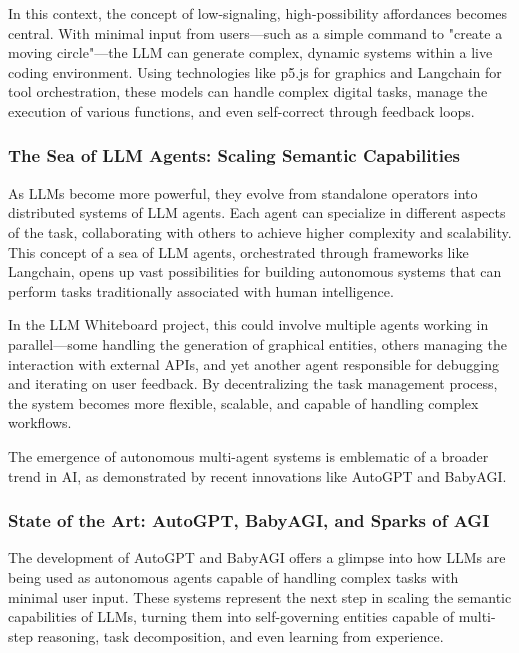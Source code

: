In this context, the concept of low-signaling, high-possibility affordances becomes central.
With minimal input from users—such as a simple command to "create a moving circle"—the LLM can generate complex, dynamic systems within a live coding environment.
Using technologies like p5.js for graphics and Langchain for tool orchestration, these models can handle complex digital tasks, manage the execution of various functions, and even self-correct through feedback loops.




\subsubsection{The Sea of LLM Agents: Scaling Semantic Capabilities}

As LLMs become more powerful, they evolve from standalone operators into distributed systems of LLM agents.
Each agent can specialize in different aspects of the task, collaborating with others to achieve higher complexity and scalability.
This concept of a sea of LLM agents, orchestrated through frameworks like Langchain, opens up vast possibilities for building autonomous systems that can perform tasks traditionally associated with human intelligence.

In the LLM Whiteboard project, this could involve multiple agents working in parallel—some handling the generation of graphical entities, others managing the interaction with external APIs, and yet another agent responsible for debugging and iterating on user feedback.
By decentralizing the task management process, the system becomes more flexible, scalable, and capable of handling complex workflows.

The emergence of autonomous multi-agent systems is emblematic of a broader trend in AI, as demonstrated by recent innovations like AutoGPT and BabyAGI.

\subsubsection{State of the Art: AutoGPT, BabyAGI, and Sparks of AGI}
The development of AutoGPT and BabyAGI offers a glimpse into how LLMs are being used as autonomous agents capable of handling complex tasks with minimal user input.
These systems represent the next step in scaling the semantic capabilities of LLMs, turning them into self-governing entities capable of multi-step reasoning, task decomposition, and even learning from experience.


